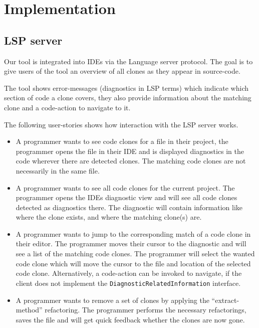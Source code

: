 \chapter{Implementation}



\section{LSP server}

Our tool is integrated into IDEs via the Language server protocol. The goal is to give
users of the tool an overview of all clones as they appear in source-code.

The tool shows error-messages (diagnostics in LSP terms) which indicate which section of
code a clone covers, they also provide information about the matching clone and a
code-action to navigate to it.

The following user-stories shows how interaction with the LSP server works.

\begin{itemize}
	\item A programmer wants to see code clones for a file in their project, the
	      programmer opens the file in their IDE and is displayed diagnostics in the code
	      wherever there are detected clones. The matching code clones are not necessarily
	      in the same file.

	\item A programmer wants to see all code clones for the current project. The
	      programmer opens the IDEs diagnostic view and will see all code clones detected
	      as diagnostics there. The diagnostic will contain information like where the clone
	      exists, and where the matching clone(s) are.

	\item A programmer wants to jump to the corresponding match of a code clone in their
	      editor. The programmer moves their cursor to the diagnostic and will see a list of
	      the matching code clones. The programmer will select the wanted code clone which
	      will move the cursor to the file and location of the selected code clone.
          Alternatively, a code-action can be invoked to navigate, if the client does not
          implement the \verb|DiagnosticRelatedInformation| interface.

      \item A programmer wants to remove a set of clones by applying the
          ``extract-method'' refactoring. The programmer performs the necessary
          refactorings, saves the file and will get quick feedback whether the
          clones are now gone.
\end{itemize}

